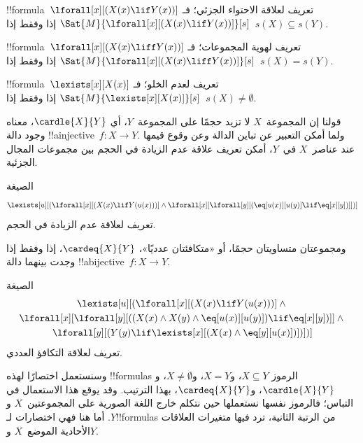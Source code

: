 \documentclass[../../../include/open-logic-section]{subfiles}
\begin{document}


\begin{prop}
!!{formula}~$\lforall[x][(X(x) \lif Y(x))]$ تعريف لعلاقة الاحتواء
الجزئي؛ فـ$\Sat{M}{\lforall[x][(X(x) \lif Y(x))]}[s]$ إذا وفقط
إذا~$s(X) \subseteq s(Y)$.
\end{prop}

\begin{prop}
!!{formula}~$\lforall[x][(X(x) \liff Y(x))]$ تعريف لهوية المجموعات؛
فـ$\Sat{M}{\lforall[x][(X(x) \liff Y(x))]}[s]$ إذا وفقط
إذا~$s(X) = s(Y)$.
\end{prop}

\begin{prop}
!!{formula}~$\lexists[x][X(x)]$ تعريف لعدم الخلو؛
فـ$\Sat{M}{\lexists[x][X(x)]}[s]$ إذا وفقط إذا~$s(X) \neq \emptyset$.
\end{prop}

قولنا إن المجموعة~$X$ لا تزيد حجمًا على المجموعة~$Y$، أي
$\cardle{X}{Y}$، معناه وجود دالة !!a{injective}~$f\colon X \to Y$.
ولما أمكن التعبير عن تباين الدالة وعن وقوع قيمها عند عناصر~$X$
في~$Y$، أمكن تعريف علاقة عدم الزيادة في الحجم بين مجموعات المجال
الجزئية.

\begin{prop}
الصيغة
\[
\lexists[u][(\lforall[x][(X(x) \lif Y(u(x)))] \land \lforall[x][\lforall[y][(\eq[u(x)][u(y)] \lif
      \eq[x][y])]])]
\]
تعريف لعلاقة عدم الزيادة في الحجم.
\end{prop}

ومجموعتان متساويتان حجمًا، أو «متكافئتان عدديًا»،
$\cardeq{X}{Y}$، إذا وفقط إذا وجدت بينهما دالة
!!a{bijective}~$f\colon X \to Y$.

\begin{prop}
الصيغة
\begin{multline*}
  \lexists[u][(\lforall[x][(X(x) \lif Y(u(x)))] \land {}\\
    \lforall[x][\lforall[y][((X(x) \land X(y) \land \eq[u(x)][u(y)]) \lif \eq[x][y])]]
  \land {} \\\lforall[y][(Y(y) \lif \lexists[x][(X(x)
      \land \eq[y][u(x)])])])]
\end{multline*}
تعريف لعلاقة التكافؤ العددي.
\end{prop}

وسنستعمل اختصارًا لهذه !!{formula}s الرموز
$X \subseteq Y$، و$X = Y$، و$X \neq \emptyset$، و$\cardle{X}{Y}$،
و$\cardeq{X}{Y}$، بهذا الترتيب.
وقد يوقع هذا الاستعمال في التباس؛ فالرموز نفسها نستعملها حين
نتكلم خارج اللغة الصورية على المجموعتين~$X$ و$Y$.
أما هنا فهي اختصارات لـ!!{formula}s من الرتبة الثانية،
ترد فيها متغيرات العلاقات الأحادية الموضع~$X$ و$Y$.
\end{document}
